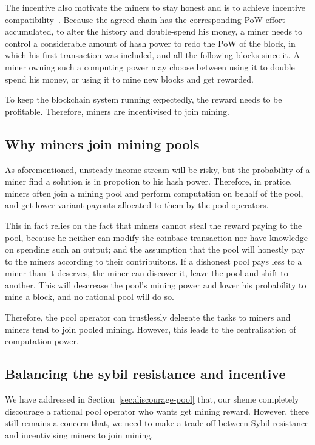 The incentive also motivate the miners to stay honest and is to achieve incentive compatibility~\cite{}.
Because the agreed chain has the corresponding PoW effort accumulated, to alter the history and double-spend his money, a miner needs to control a considerable amount of hash power to redo the PoW of the block, in which his first transaction was included, and all the following blocks since it.
A miner owning such a computing power may choose between using it to double spend his money, or using it to mine new blocks and get rewarded. 

To keep the blockchain system running expectedly, the reward needs to be profitable.
Therefore, miners are incentivised to join mining.

\subsection{Why miners join mining pools}

As aforementioned, unsteady income stream will be risky, but the probability of a miner find a solution is in propotion to his hash power.
Therefore, in pratice, miners often join a mining pool and perform computation on behalf of the pool, and get lower variant payouts allocated to them by the pool operators.

This in fact relies on the fact that miners cannot steal the reward paying to the pool, because he neither can modify the coinbase transaction nor have knowledge on spending such an output;
and the assumption that the pool will honestly pay to the miners according to their contribuitons.
If a dishonest pool pays less to a miner than it deserves, the miner can discover it, leave the pool and shift to another.
This will descrease the pool's mining power and lower his probability to mine a block, and no rational pool will do so.

Therefore, the pool operator can trustlessly delegate the tasks to miners and miners tend to join pooled mining.
However, this leads to the centralisation of computation power.

\subsection{Balancing the sybil resistance and incentive}
\label{sebsec:balancing}

We have addressed in Section~\ref{sec:discourage-pool} that, our sheme completely discourage a rational pool operator who wants get mining reward.
However, there still remains a concern that, we need to make a trade-off between Sybil resistance and incentivising miners to join mining.

